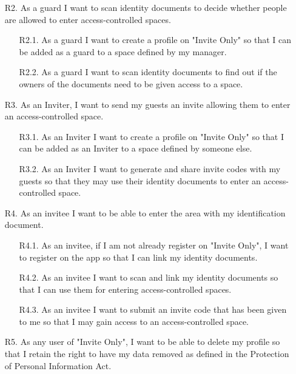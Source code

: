 \begin{itemize}
    \newpage
    
    \item[R2.] As a guard I want to scan identity documents to decide whether people are allowed to enter access-controlled spaces.
    \begin{itemize}
        \item[R2.1.] As a guard I want to create a profile on "Invite Only" so that I can be added as a guard to a space defined by my manager.
        \item[R2.2.] As a guard I want to scan identity documents to find out if the owners of the documents need to be given access to a space.
    \end{itemize}
    
    \item[R3.] As an Inviter, I want to send my guests an invite allowing them to enter an access-controlled space.
    \begin{itemize}
        \item[R3.1.] As an Inviter I want to create a profile on "Invite Only" so that I can be added as an Inviter to a space defined by someone else.
        \item[R3.2.] As an Inviter I want to generate and share invite codes with my guests so that they may use their identity documents to enter an access-controlled space.
    \end{itemize}
    
    \item[R4.] As an invitee I want to be able to enter the area with my identification document.
    \begin{itemize}
        \item[R4.1.] As an invitee, if I am not already register on "Invite Only", I want to register on the app so that I can link my identity documents.
        \item[R4.2.] As an invitee I want to scan and link my identity documents so that I can use them for entering access-controlled spaces.
        \item[R4.3.] As an invitee I want to submit an invite code that has been given to me so that I may gain access to an access-controlled space.
    \end{itemize}
    
    \item[R5.] As any user of "Invite Only", I want to be able to delete my profile so that I retain the right to have my data removed as defined in the Protection of Personal Information Act.
    
\end{itemize}

